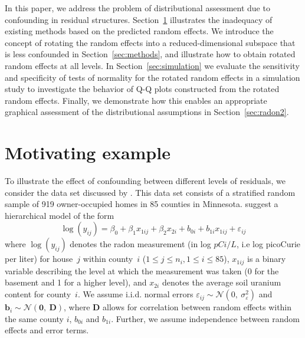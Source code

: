 \documentclass[12pt]{article} %
\begin{document}
In this paper, we address the problem of distributional assessment due to confounding in residual structures. Section~\ref{sec:ex} illustrates the inadequacy of existing methods based on the predicted random effects. We introduce the concept of rotating the random effects into a reduced-dimensional subspace that is less confounded in Section~\ref{sec:methods}, and illustrate how to obtain rotated random effects at all levels. In Section~\ref{sec:simulation} we evaluate the sensitivity and specificity of tests of normality for the rotated random effects in a simulation study to investigate the behavior of Q-Q plots constructed from the rotated random effects. Finally, we demonstrate how this enables an appropriate graphical assessment of the distributional assumptions in Section~\ref{sec:radon2}. %


\section{Motivating example}\label{sec:ex}
To illustrate the effect of confounding between different levels of residuals, we consider the data set discussed by
 \cite{Gelman:2006ue}. This data set consists of a stratified random sample of 919 owner-occupied homes in 85 counties in Minnesota.  \cite{Gelman:2006ue}  suggest a hierarchical model of the form
%
\begin{equation}\label{eq:radon}
  \log(y_{ij}) = \beta_0 + \beta_1 x_{1ij} + \beta_2 x_{2i} + b_{0i} + b_{1i} x_{1ij}  + \varepsilon_{ij}
\end{equation}
%
where   $\log(y_{ij})$ denotes the  radon measurement (in log $pCi/L$, i.e log picoCurie per liter) for house~$j$ within county~$i$ ($1 \le j \le n_i, 1 \le i \le 85$),
 $x_{1ij}$ is a binary variable describing the level at which the measurement was taken (0 for the basement and 1 for a higher level), and $x_{2i}$ denotes the average soil uranium content for  county~$i$. 
 We assume i.i.d. normal errors $\varepsilon_{ij} \sim \mathcal{N} (0,\ \sigma^2_{\varepsilon})$  and $\bm{b}_i \sim \mathcal{N}(\bm{0},\ \bm{D})$, where $\bm{D}$ allows for correlation between random effects within the same county $i$, $b_{0i}$ and $b_{1i}$. Further, we assume independence between random effects and error terms. 
\end{document}
